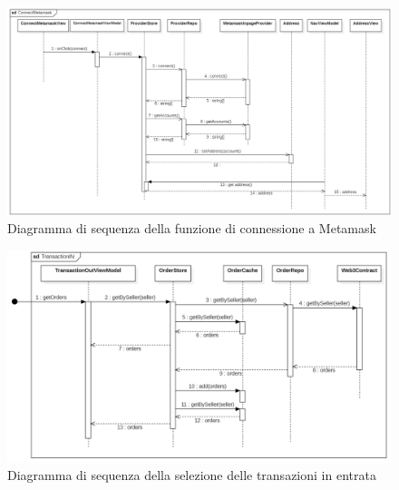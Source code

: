 \begin{landscape}
    \begin{figure}[H]
        \begin{center}
        \includegraphics[scale=0.7]{immagini/metamask.png}
        \caption{Diagramma di sequenza della funzione di connessione a Metamask}
        \end{center}
    \end{figure}
\end{landscape}

\begin{landscape}
    \begin{figure}[H]
        \begin{center}
        \includegraphics[scale=0.7]{immagini/TransactionIN.png}
        \caption{Diagramma di sequenza della selezione delle transazioni in entrata}
        \end{center}
    \end{figure}
\end{landscape}


